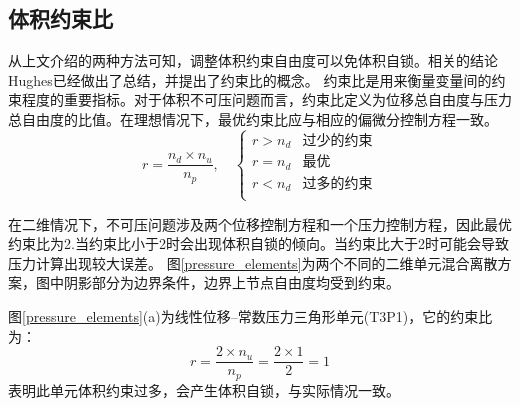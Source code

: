 \subsection{体积约束比}
从上文介绍的两种方法可知，调整体积约束自由度可以免体积自锁。相关的结论Hughes已经做出了总结\cite{hughes2000}，并提出了约束比的概念。
约束比是用来衡量变量间的约束程度的重要指标。对于体积不可压问题而言，约束比定义为位移总自由度与压力总自由度的比值。在理想情况下，最优约束比应与相应的偏微分控制方程一致。
\begin{equation}
    r = \frac{n_d\times n_u}{n_p}, \quad 
    \begin{cases}
        r > n_d & \text{过少的约束} \\
        r = n_d & \text{最优} \\
        r < n_d & \text{过多的约束} \\
    \end{cases}
\end{equation}

在二维情况下，不可压问题涉及两个位移控制方程和一个压力控制方程，因此最优约束比为2.当约束比小于2时会出现体积自锁的倾向。当约束比大于2时可能会导致压力计算出现较大误差。
图\ref{pressure_elements}为两个不同的二维单元混合离散方案，图中阴影部分为边界条件，边界上节点自由度均受到约束。

图\ref{pressure_elements}(a)为线性位移--常数压力三角形单元(T3P1)，它的约束比为：
\begin{equation}
    r= \frac{2\times n_u}{n_p}=\frac{2\times 1}{2}=1
\end{equation}
表明此单元体积约束过多，会产生体积自锁，与实际情况一致。

